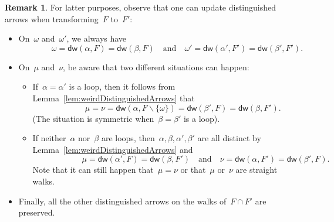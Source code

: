 \documentclass{memo-l}
\theoremstyle{definition}
\newtheorem{remark}[theorem]{Remark}
\newcommand{\ssm}{\smallsetminus} %
\newcommand{\distinguishedWalk}[2]{\mathsf{dw}(#1,#2)} %
\begin{document}
\begin{remark}
\label{rem:changeDistinguishedArrows}
For latter purposes, observe that one can update distinguished arrows when transforming~$F$ to~$F'$:
\begin{itemize}
\item On~$\omega$ and~$\omega'$, we always have
\[
\qquad\qquad
\omega = \distinguishedWalk{\alpha}{F} = \distinguishedWalk{\beta}{F}
\quad\text{and}\quad
\omega' = \distinguishedWalk{\alpha'}{F'} = \distinguishedWalk{\beta'}{F'}.
\]

\item On~$\mu$ and~$\nu$, be aware that two different situations can happen:
\begin{itemize}
\item If~$\alpha = \alpha'$ is a loop, then it follows from Lemma~\ref{lem:weirdDistinguishedArrows} that
\[
\qquad\qquad
\mu = \nu = \distinguishedWalk{\alpha}{F \ssm \{\omega\}} = \distinguishedWalk{\beta'}{F} = \distinguishedWalk{\beta}{F'}.
\]
(The situation is symmetric when~$\beta = \beta'$ is a loop).
\item If neither~$\alpha$ nor~$\beta$ are loops, then~$\alpha, \beta, \alpha', \beta'$ are all distinct by Lemma~\ref{lem:weirdDistinguishedArrows} and
\[
\qquad\qquad\qquad
\mu = \distinguishedWalk{\alpha'}{F} = \distinguishedWalk{\beta}{F'}
\quad\text{and}\quad
\nu = \distinguishedWalk{\alpha}{F'} = \distinguishedWalk{\beta'}{F}.
\]
Note that it can still happen that~$\mu = \nu$ or that~$\mu$ or~$\nu$ are straight walks.
\end{itemize}
\item Finally, all the other distinguished arrows on the walks of~$F \cap F'$ are preserved.
\end{itemize}

\end{remark}
\end{document}
